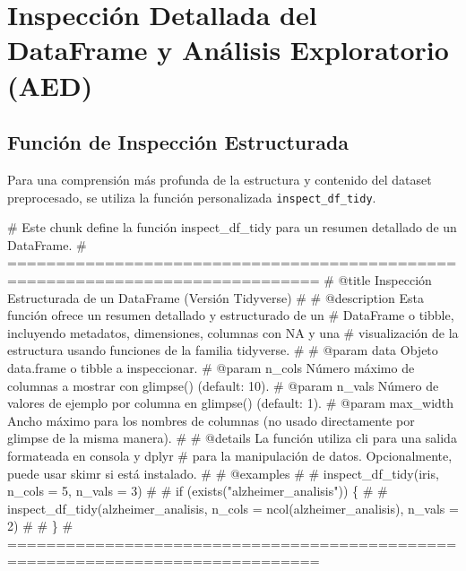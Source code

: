\documentclass[
  letterpaper,
  DIV=11,
  numbers=noendperiod]{scrartcl}
\newenvironment{Shaded}{\begin{snugshade}}{\end{snugshade}}
\newcommand{\CommentTok}[1]{\textcolor[rgb]{0.37,0.37,0.37}{#1}}
\begin{document}
\section{Inspección Detallada del DataFrame y Análisis Exploratorio
(AED)}\label{inspecciuxf3n-detallada-del-dataframe-y-anuxe1lisis-exploratorio-aed}

\subsection{Función de Inspección
Estructurada}\label{funciuxf3n-de-inspecciuxf3n-estructurada}

Para una comprensión más profunda de la estructura y contenido del
dataset preprocesado, se utiliza la función personalizada
\texttt{inspect\_df\_tidy}.

\begin{Shaded}
\begin{Highlighting}[]
\CommentTok{\# Este chunk define la función \textquotesingle{}inspect\_df\_tidy\textquotesingle{} para un resumen detallado de un DataFrame.}
\CommentTok{\# ==============================================================================}
\CommentTok{\#\textquotesingle{} @title Inspección Estructurada de un DataFrame (Versión Tidyverse)}
\CommentTok{\#\textquotesingle{}}
\CommentTok{\#\textquotesingle{} @description Esta función ofrece un resumen detallado y estructurado de un}
\CommentTok{\#\textquotesingle{} DataFrame o tibble, incluyendo metadatos, dimensiones, columnas con NA y una}
\CommentTok{\#\textquotesingle{} visualización de la estructura usando funciones de la familia tidyverse.}
\CommentTok{\#\textquotesingle{}}
\CommentTok{\#\textquotesingle{} @param data Objeto \textasciigrave{}data.frame\textasciigrave{} o \textasciigrave{}tibble\textasciigrave{} a inspeccionar.}
\CommentTok{\#\textquotesingle{} @param n\_cols Número máximo de columnas a mostrar con \textasciigrave{}glimpse()\textasciigrave{} (default: 10).}
\CommentTok{\#\textquotesingle{} @param n\_vals Número de valores de ejemplo por columna en \textasciigrave{}glimpse()\textasciigrave{} (default: 1).}
\CommentTok{\#\textquotesingle{} @param max\_width Ancho máximo para los nombres de columnas (no usado directamente por glimpse de la misma manera).}
\CommentTok{\#\textquotesingle{}}
\CommentTok{\#\textquotesingle{} @details La función utiliza \textasciigrave{}cli\textasciigrave{} para una salida formateada en consola y \textasciigrave{}dplyr\textasciigrave{}}
\CommentTok{\#\textquotesingle{} para la manipulación de datos. Opcionalmente, puede usar \textasciigrave{}skimr\textasciigrave{} si está instalado.}
\CommentTok{\#\textquotesingle{}}
\CommentTok{\#\textquotesingle{} @examples}
\CommentTok{\#\textquotesingle{} \# inspect\_df\_tidy(iris, n\_cols = 5, n\_vals = 3)}
\CommentTok{\#\textquotesingle{} \# if (exists("alzheimer\_analisis")) \{}
\CommentTok{\#\textquotesingle{} \#   inspect\_df\_tidy(alzheimer\_analisis, n\_cols = ncol(alzheimer\_analisis), n\_vals = 2)}
\CommentTok{\#\textquotesingle{} \# \}}
\CommentTok{\# ==============================================================================}


\end{Highlighting}
\end{Shaded}
\end{document}
